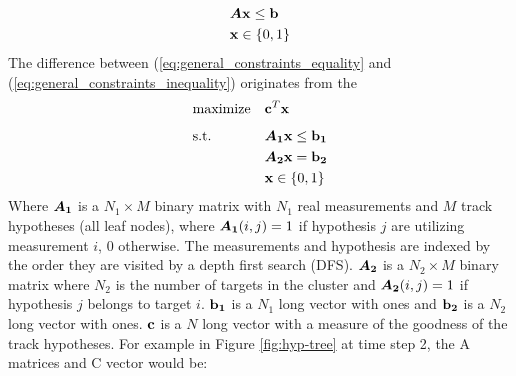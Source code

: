 \begin{equation}
\begin{aligned}
&	\bm{A} \boldsymbol{\mathbf{x}} \leq \boldsymbol{\mathbf{b}} 	\\
&	\boldsymbol{\mathbf{x}} \in \{0,1\}
\end{aligned}
\label{eq:general_constraints_inequality}
\end{equation}
The difference between (\ref{eq:general_constraints_equality} and (\ref{eq:general_constraints_inequality}) originates from the   
\begin{equation}
\begin{aligned}
&	\underset{}{\text{maximize}}
&&	\boldsymbol{\mathbf{c}}^T \boldsymbol{\mathbf{x}} \\
&	\text{s.t.}
&&	\bm{A_1} \boldsymbol{\mathbf{x}} \leq \boldsymbol{\mathbf{b_1}} 	\\
&&&	\bm{A_2} \boldsymbol{\mathbf{x}} = \boldsymbol{\mathbf{b_2}}	\\
&&&	\boldsymbol{\mathbf{x}} \in \{0,1\}
\end{aligned}
\end{equation}
Where $\bm{A_1}$ is a $N_1 \times M$ binary matrix with $N_1$ real measurements and $M$ track hypotheses (all leaf nodes), where $\bm{A_1}(i,j)=1$ if hypothesis $j$ are utilizing measurement $i$, $0$ otherwise. The measurements and hypothesis are indexed by the order they are visited by a depth first search (DFS). $\bm{A_2}$ is a $N_2 \times M$ binary matrix where $N_2$ is the number of targets in the cluster and $\bm{A_2}(i,j)=1$ if hypothesis $j$ belongs to target $i$. $\boldsymbol{\mathbf{b_1}}$ is a $N_1$ long vector with ones and $\boldsymbol{\mathbf{b_2}}$ is a $N_2$ long vector with ones. $\boldsymbol{\mathbf{c}}$ is a $N$ long vector with a measure of the goodness of the track hypotheses. For example in Figure \ref{fig:hyp-tree} at time step 2, the A matrices  and C vector would be:
